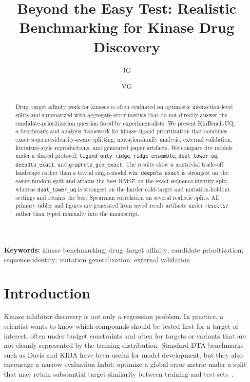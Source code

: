 \documentclass[11pt]{article}
\title{Beyond the Easy Test: Realistic Benchmarking for Kinase Drug Discovery}
\author[1]{JG}
\author[1]{VG}
\affil[1]{Independent Research}
\date{}
\begin{document}
\maketitle

\begin{abstract}
Drug--target affinity work for kinases is often evaluated on optimistic
interaction-level splits and summarized with aggregate error metrics that do
not directly answer the candidate-prioritization question faced by
experimentalists. We present KinBench-UQ, a benchmark and analysis framework
for kinase--ligand prioritization that combines exact sequence-identity-aware
splitting, mutation-family analysis, external validation, literature-style
reproductions, and generated paper artifacts. We compare
five models under a shared protocol: \texttt{ligand\_only\_ridge},
\texttt{ridge\_ensemble}, \texttt{dual\_tower\_uq}, \texttt{deepdta\_exact},
and \texttt{graphdta\_gcn\_exact}. The results show a nontrivial trade-off
landscape rather than a trivial single-model win: \texttt{deepdta\_exact} is
strongest on the easier random split and attains the best RMSE on the exact
sequence-identity split, whereas \texttt{dual\_tower\_uq} is strongest on the
harder cold-target and mutation-holdout settings and retains the best Spearman
correlation on several realistic splits. All primary tables and figures are
generated from saved result artifacts under \texttt{results/} rather than
typed manually into the manuscript.
\end{abstract}

\noindent\textbf{Keywords:} kinase benchmarking; drug--target affinity;
candidate prioritization; sequence identity; mutation generalization; external
validation

\section{Introduction}

Kinase inhibitor discovery is not only a regression problem. In practice, a
scientist wants to know which compounds should be tested first for a target of
interest, often under budget constraints and often for targets or variants that
are not cleanly represented by the training distribution. Standard DTA
benchmarks such as Davis and KIBA have been useful for model development, but
they also encourage a narrow evaluation habit: optimize a global error metric
under a split that may retain substantial target similarity between training
and test sets~\cite{davis_dataset,kiba_dataset}.
\end{document}
